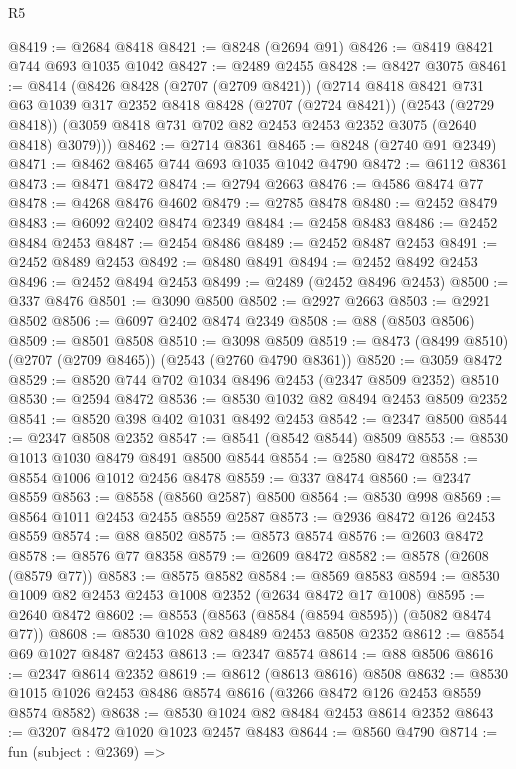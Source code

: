 \begin{lexlean}{R5}
\begin{coremodule}
@8419 := @2684 @8418
@8421 := @8248 (@2694 @91)
@8426 := @8419 @8421 @744 @693 @1035 @1042
@8427 := @2489 @2455
@8428 := @8427 @3075
@8461 := @8414
    (@8426
      @8428
      (@2707 (@2709 @8421))
      (@2714
        @8418
        @8421
        @731
        @63
        @1039
        @317
        @2352
        @8418
        @8428
        (@2707 (@2724 @8421))
        (@2543 (@2729 @8418))
        (@3059 @8418 @731 @702 @82 @2453 @2453 @2352 @3075 (@2640 @8418) @3079)))
@8462 := @2714 @8361
@8465 := @8248 (@2740 @91 @2349)
@8471 := @8462 @8465 @744 @693 @1035 @1042 @4790
@8472 := @6112 @8361
@8473 := @8471 @8472
@8474 := @2794 @2663
@8476 := @4586 @8474 @77
@8478 := @4268 @8476 @4602
@8479 := @2785 @8478
@8480 := @2452 @8479
@8483 := @6092 @2402 @8474 @2349
@8484 := @2458 @8483
@8486 := @2452 @8484 @2453
@8487 := @2454 @8486
@8489 := @2452 @8487 @2453
@8491 := @2452 @8489 @2453
@8492 := @8480 @8491
@8494 := @2452 @8492 @2453
@8496 := @2452 @8494 @2453
@8499 := @2489 (@2452 @8496 @2453)
@8500 := @337 @8476
@8501 := @3090 @8500
@8502 := @2927 @2663
@8503 := @2921 @8502
@8506 := @6097 @2402 @8474 @2349
@8508 := @88 (@8503 @8506)
@8509 := @8501 @8508
@8510 := @3098 @8509
@8519 := @8473 (@8499 @8510) (@2707 (@2709 @8465)) (@2543 (@2760 @4790 @8361))
@8520 := @3059 @8472
@8529 := @8520 @744 @702 @1034 @8496 @2453 (@2347 @8509 @2352) @8510
@8530 := @2594 @8472
@8536 := @8530 @1032 @82 @8494 @2453 @8509 @2352
@8541 := @8520 @398 @402 @1031 @8492 @2453
@8542 := @2347 @8500
@8544 := @2347 @8508 @2352
@8547 := @8541 (@8542 @8544) @8509
@8553 := @8530 @1013 @1030 @8479 @8491 @8500 @8544
@8554 := @2580 @8472
@8558 := @8554 @1006 @1012 @2456 @8478
@8559 := @337 @8474
@8560 := @2347 @8559
@8563 := @8558 (@8560 @2587) @8500
@8564 := @8530 @998
@8569 := @8564 @1011 @2453 @2455 @8559 @2587
@8573 := @2936 @8472 @126 @2453 @8559
@8574 := @88 @8502
@8575 := @8573 @8574
@8576 := @2603 @8472
@8578 := @8576 @77 @8358
@8579 := @2609 @8472
@8582 := @8578 (@2608 (@8579 @77))
@8583 := @8575 @8582
@8584 := @8569 @8583
@8594 := @8530 @1009 @82 @2453 @2453 @1008 @2352 (@2634 @8472 @17 @1008)
@8595 := @2640 @8472
@8602 := @8553 (@8563 (@8584 (@8594 @8595)) (@5082 @8474 @77))
@8608 := @8530 @1028 @82 @8489 @2453 @8508 @2352
@8612 := @8554 @69 @1027 @8487 @2453
@8613 := @2347 @8574
@8614 := @88 @8506
@8616 := @2347 @8614 @2352
@8619 := @8612 (@8613 @8616) @8508
@8632 := @8530 @1015 @1026 @2453 @8486 @8574 @8616 (@3266 @8472 @126 @2453 @8559 @8574 @8582)
@8638 := @8530 @1024 @82 @8484 @2453 @8614 @2352
@8643 := @3207 @8472 @1020 @1023 @2457 @8483
@8644 := @8560 @4790
@8714 := fun (subject : @2369) =>

\end{coremodule}
\end{lexlean}
